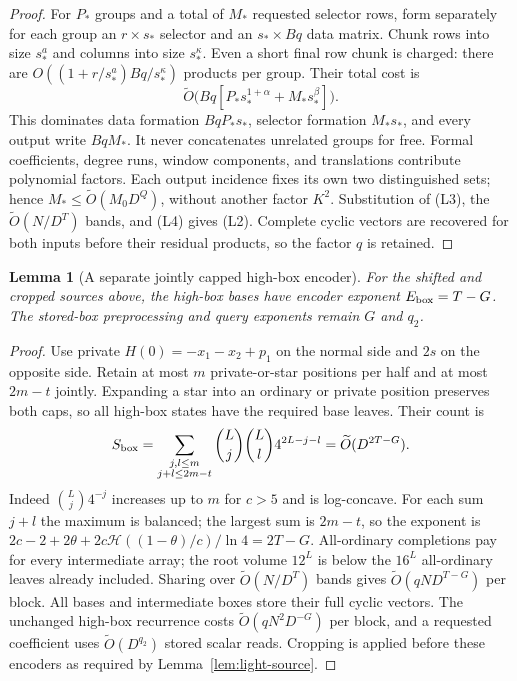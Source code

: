 \documentclass[11pt]{article}
\newtheorem{lemma}[theorem]{Lemma}
\newcommand{\softO}{\widetilde O}
\newcommand{\HH}{\mathcal H}
\begin{document}
\begin{proof}
For $P_*$ groups and a total of $M_*$ requested selector rows,
form separately for each group an $r\times s_*$ selector and an
$s_*\times Bq$ data matrix. Chunk rows into size $s_*^a$ and
columns into size $s_*^\kappa$. Even a short final row chunk is
charged: there are
$O((1+r/s_*^a)Bq/s_*^\kappa)$ products per group. Their total cost is
\[
 \softO\bigl(Bq[P_*s_*^{1+\alpha}+M_*s_*^\beta]\bigr). \tag{L4}
\]
This dominates data formation $BqP_*s_*$, selector formation
$M_*s_*$, and every output write $BqM_*$. It never concatenates
unrelated groups for free. Formal coefficients, degree runs,
window components, and translations contribute polynomial factors.
Each output incidence fixes its own two distinguished sets; hence
$M_*\le\softO(M_0D^Q)$, without another factor $K^2$.
Substitution of (L3), the $\softO(N/D^T)$ bands, and (L4)
gives (L2). Complete cyclic vectors are recovered for both inputs
before their residual products, so the factor $q$ is retained.
\end{proof}

\begin{lemma}[A separate jointly capped high-box encoder]
\label{lem:light-box}
For the shifted and cropped sources above, the high-box bases have
encoder exponent $E_{\rm box}=T-G$. The stored-box preprocessing
and query exponents remain $G$ and $q_2$.
\end{lemma}
\begin{proof}
Use private $H(0)=-x_1-x_2+p_1$ on the normal side and $2s$ on
the opposite side. Retain at most $m$ private-or-star positions
per half and at most $2m-t$ jointly. Expanding a star into an
ordinary or private position preserves both caps, so all high-box
states have the required base leaves. Their count is
\[
 S_{\rm box}=
 \sum_{\substack{j,l\le m\\j+l\le2m-t}}
       \binom Lj\binom Ll4^{2L-j-l}
 =\softO(D^{2T-G}).
\]
Indeed $\binom Lj4^{-j}$ increases up to $m$ for $c>5$ and is
log-concave. For each sum $j+l$ the maximum is balanced; the
largest sum is $2m-t$, so the exponent is
$2c-2+2\theta+2c\HH((1-\theta)/c)/\ln4=2T-G$.
All-ordinary completions pay for every intermediate array; the
root volume $12^L$ is below the $16^L$ all-ordinary leaves already
included. Sharing over $\softO(N/D^T)$ bands gives
$\softO(qND^{T-G})$ per block. All bases and intermediate boxes
store their full cyclic vectors. The unchanged high-box recurrence
costs $\softO(qN^2D^{-G})$ per block, and a requested coefficient
uses $\softO(D^{q_2})$ stored scalar reads. Cropping is applied
before these encoders as required by Lemma~\ref{lem:light-source}.
\end{proof}
\end{document}
